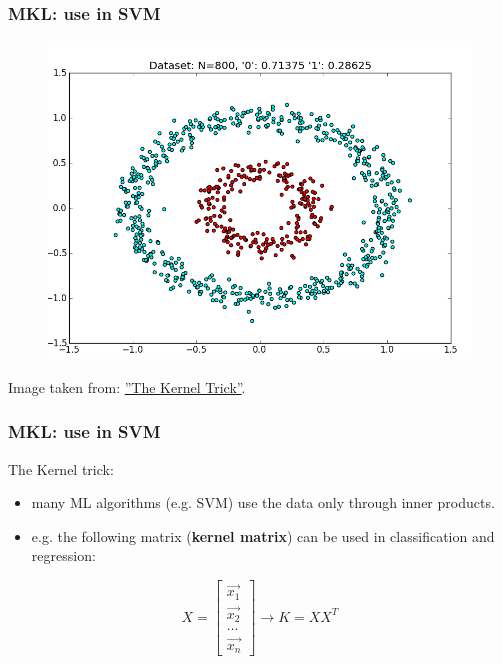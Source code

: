 \documentclass{beamer}
\begin{document}
\begin{frame}
\frametitle{MKL: use in SVM}

\begin{figure}
\includegraphics[width=0.9\linewidth]{dataset_nonsep}
\end{figure}
Image taken from: \hyperref[http://www.eric-kim.net/eric-kim-net/posts/1/kernel_trick.html]{''The Kernel Trick''}.

\end{frame}


\begin{frame}
\frametitle{MKL: use in SVM}

The Kernel trick:

\begin{itemize}
\item many ML algorithms (e.g. SVM) use the data only through inner products.
\item e.g. the following matrix (\textbf{kernel matrix}) can be used in classification and regression:
\end{itemize}

\begin{equation}
 X=\begin{bmatrix}
  \vec{x_{1}} \\
  \vec{x_{2}} \\
  ...\\
  \vec{x_{n}}
 \end{bmatrix} \rightarrow 
  K = XX^{T}
\end{equation}

\end{frame}
\end{document}
